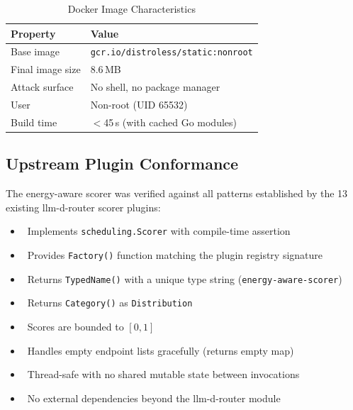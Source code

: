 \begin{table}[htbp]
\centering
\caption{Docker Image Characteristics}
\label{tab:docker-image}
\begin{tabular}{ll}
\toprule
\textbf{Property} & \textbf{Value} \\
\midrule
Base image & \texttt{gcr.io/distroless/static:nonroot} \\
Final image size & 8.6\,MB \\
Attack surface & No shell, no package manager \\
User & Non-root (UID 65532) \\
Build time & $<$45\,s (with cached Go modules) \\
\bottomrule
\end{tabular}
\end{table}

\subsection{Upstream Plugin Conformance}
\label{subsec:conformance}

The energy-aware scorer was verified against all patterns established by the 13 existing llm-d-router scorer plugins:

\begin{itemize}
    \item \checkmark\, Implements \texttt{scheduling.Scorer} with compile-time assertion
    \item \checkmark\, Provides \texttt{Factory()} function matching the plugin registry signature
    \item \checkmark\, Returns \texttt{TypedName()} with a unique type string (\texttt{energy-aware-scorer})
    \item \checkmark\, Returns \texttt{Category()} as \texttt{Distribution}
    \item \checkmark\, Scores are bounded to $[0, 1]$
    \item \checkmark\, Handles empty endpoint lists gracefully (returns empty map)
    \item \checkmark\, Thread-safe with no shared mutable state between invocations
    \item \checkmark\, No external dependencies beyond the llm-d-router module
\end{itemize}


%
%
%
